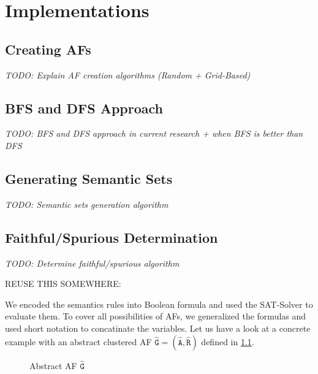 \chapter{Implementations}


\section{Creating AFs}
\textit{TODO: Explain AF creation algorithms (Random + Grid-Based)}



\section{BFS and DFS Approach}
\textit{TODO: BFS and DFS approach in current research + when BFS is better than DFS}

\section{Generating Semantic Sets}
\textit{TODO: Semantic sets generation algorithm}

\section{Faithful/Spurious Determination}
\textit{TODO: Determine faithful/spurious algorithm}


REUSE THIS SOMEWHERE:

We encoded the semantics rules into Boolean formula and used the SAT-Solver to evaluate them. To cover all possibilities of AFs, we generalized the formulas and used short notation to concatinate the variables. Let us have a look at a concrete example with an abstract clustered AF $\mathtt{\hat{G}=(\hat{A}, \hat{R})}$ defined in \cref{af:backgroundSATExample1}.



\begin{figure}[h]
    \centering
    \caption{Abstract AF $\mathtt{\hat{G}}$}
    \label{af:backgroundSATExample1}
\end{figure}


